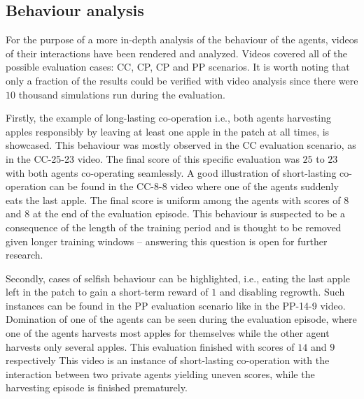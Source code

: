 \documentclass[preprint,12pt,authoryear]{elsarticle}
\begin{document}
\subsection{Behaviour analysis}

For the purpose of a more in-depth analysis of the behaviour of the agents, videos of their interactions have been rendered and analyzed. Videos covered all of the possible evaluation cases: CC, CP, CP and PP scenarios. It is worth noting that only a fraction of the results could be verified with video analysis since there were $10$ thousand simulations run during the evaluation. 

Firstly, the example of long-lasting co-operation i.e., both agents harvesting apples responsibly by leaving at least one apple in the patch at all times, is showcased. This behaviour was mostly observed in the CC evaluation scenario, as in the CC-25-23 video. The final score of this specific evaluation was $25$ to $23$ with both agents co-operating seamlessly. 
A good illustration of short-lasting co-operation can be found in the CC-8-8 video where one of the agents suddenly eats the last apple. The final score is uniform among the agents with scores of $8$ and $8$ at the end of the evaluation episode. This behaviour is suspected to be a consequence of the length of the training period and is thought to be removed given longer training windows -- answering this question is open for further research. 

Secondly, cases of selfish behaviour can be highlighted, i.e., eating the last apple left in the patch to gain a short-term reward of $1$ and disabling regrowth.
Such instances can be found in the PP evaluation scenario like in the PP-14-9 video. Domination of one of the agents can be seen during the evaluation episode, where one of the agents harvests most apples for themselves while the other agent harvests only several apples. This evaluation finished with scores of $14$ and $9$ respectively
This video is an instance of short-lasting co-operation with the interaction between two private agents yielding uneven scores, while the harvesting episode is finished prematurely.
\end{document}

